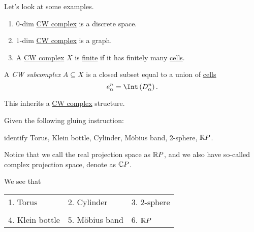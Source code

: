 \begin{eg}
	Let's look at some examples.
	\begin{enumerate}
		\item \(0\)-dim \hyperref[def:CW-Complex]{CW complex} is a discrete space.
		\item \(1\)-dim \hyperref[def:CW-Complex]{CW complex} is a graph.
		\item A \hyperref[def:CW-Complex]{CW complex} \(X\) is \underline{finite} if it has finitely many \hyperref[def:cell]{cells}.
	\end{enumerate}
\end{eg}

\begin{definition}[CW subcomplex]\label{def:CW-subcomplex}
	A \emph{CW subcomplex} \(A\subseteq X\) is a closed subset equal to a union of \hyperref[def:cell]{cells}
	\[
		e^n_{\alpha} = \Int \left(D^n_{\alpha}\right).
	\]
\end{definition}
\begin{remark}
	This inherits a \hyperref[def:CW-Complex]{CW complex} structure.
\end{remark}

\begin{exercise}
	Given the following gluing instruction:
	\begin{figure}[H]
		\centering
		\label{fig:ex:CW-complex-gluing}
	\end{figure}
	identify Torus, Klein bottle, Cylinder, Möbius band, 2-sphere, \(\mathbb{\MakeUppercase{R}} P\).

	\begin{notation}
		Notice that we call the real projection space as \(\mathbb{\MakeUppercase{R}} P\), and we also have so-called
		complex projection space, denote as \(\mathbb{\MakeUppercase{C}} P\).
	\end{notation}
\end{exercise}
\begin{answer}
	We see that
	\begin{table}[H]
		\centering
		\begin{tabular}{lll}
			1. Torus        & 2. Cylinder    & 3. 2-sphere                                 \\\\
			4. Klein bottle & 5. Möbius band & 6.         \(\mathbb{\MakeUppercase{R}} P\) \\
		\end{tabular}
	\end{table}
\end{answer}


